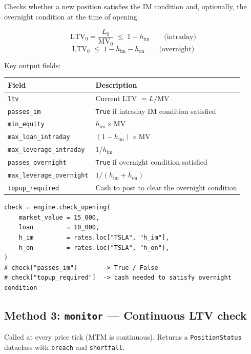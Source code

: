 \documentclass[9pt, a4paper]{extarticle}
\newenvironment{formulabox}{\par\addvspace{4pt}}{\par\addvspace{4pt}}
\begin{document}
Checks whether a new position satisfies the IM condition and, optionally, the
overnight condition at the time of opening.

\begin{formulabox}
\[
    \mathrm{LTV}_0 = \frac{L_0}{\mathrm{MV}_0} \;\leq\; 1 - h_{\mathrm{im}}
    \qquad\text{(intraday)}
\]
\[
    \mathrm{LTV}_0 \;\leq\; 1 - h_{\mathrm{im}} - h_{\mathrm{on}}
    \qquad\text{(overnight)}
\]
\end{formulabox}

Key output fields:

\begin{tabularx}{\linewidth}{lX}
\toprule
\textbf{Field} & \textbf{Description} \\
\midrule
\texttt{ltv}                    & Current LTV $= L / \mathrm{MV}$ \\
\texttt{passes\_im}             & \texttt{True} if intraday IM condition satisfied \\
\texttt{min\_equity}            & $h_{\mathrm{im}} \times \mathrm{MV}$ \\
\texttt{max\_loan\_intraday}    & $(1 - h_{\mathrm{im}}) \times \mathrm{MV}$ \\
\texttt{max\_leverage\_intraday}& $1 / h_{\mathrm{im}}$ \\
\texttt{passes\_overnight}      & \texttt{True} if overnight condition satisfied \\
\texttt{max\_leverage\_overnight}& $1 / (h_{\mathrm{im}} + h_{\mathrm{on}})$ \\
\texttt{topup\_required}        & Cash to post to clear the overnight condition \\
\bottomrule
\end{tabularx}

\begin{lstlisting}
check = engine.check_opening(
    market_value = 15_000,
    loan         = 10_000,
    h_im         = rates.loc["TSLA", "h_im"],
    h_on         = rates.loc["TSLA", "h_on"],
)
# check["passes_im"]       -> True / False
# check["topup_required"]  -> cash needed to satisfy overnight condition
\end{lstlisting}

\subsection{Method 3: \texttt{monitor} — Continuous LTV check}

Called at every price tick (MTM is continuous). Returns a \texttt{PositionStatus}
dataclass with \texttt{breach} and \texttt{shortfall}.
\end{document}
